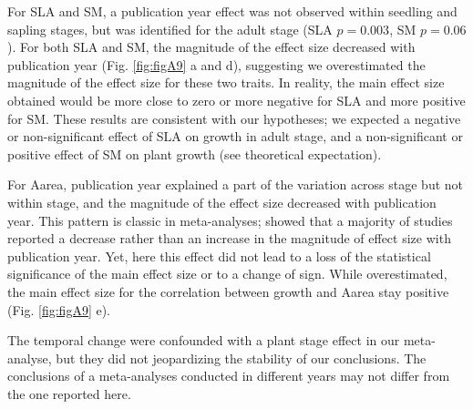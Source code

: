 \documentclass[a4paper,11pt]{article}
\begin{document}
\begin{appendices}
For SLA and SM, a publication year effect was not observed within seedling and sapling stages, but was identified for the adult stage (SLA $p = 0.003$, SM $p = 0.06$). For both SLA and SM, the magnitude of the effect size decreased with publication year (Fig. \ref{fig:figA9} a and d), suggesting we overestimated the magnitude of the effect size for these two traits. In reality, the main effect size obtained would be more close to zero or more negative for SLA and more positive for SM. These results are consistent with our hypotheses; we expected a negative or non-significant effect of SLA on growth in adult stage, and a non-significant or positive effect of SM on plant growth (see theoretical expectation).

For Aarea, publication year explained a part of the variation across stage but not within stage, and the magnitude of the effect size decreased with publication year. This pattern is classic in meta-analyses; \citealt{Koricheva:2013hy} showed that a majority of studies reported a decrease rather than an increase in the magnitude of effect size with publication year. Yet, here this effect did not lead to a loss of the statistical significance of the main effect size or to a change of sign. While overestimated, the main effect size for the correlation between growth and Aarea stay positive (Fig. \ref{fig:figA9} e).  

The temporal change were confounded with a plant stage effect in our meta-analyse, but they did not jeopardizing the stability of our conclusions. The conclusions of a meta-analyses conducted in different years may not differ from the one reported here.


\end{appendices}
\end{document}
